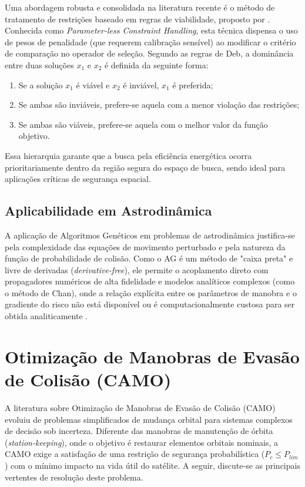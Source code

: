 Uma abordagem robusta e consolidada na literatura recente é o método de tratamento de restrições baseado em regras de viabilidade, proposto por . Conhecida como \textit{Parameter-less Constraint Handling}, esta técnica dispensa o uso de pesos de penalidade (que requerem calibração sensível) ao modificar o critério de comparação no operador de seleção. Segundo as regras de Deb, a dominância entre duas soluções $x_1$ e $x_2$ é definida da seguinte forma:

\begin{enumerate}
    \item Se a solução $x_1$ é viável e $x_2$ é inviável, $x_1$ é preferida;
    \item Se ambas são inviáveis, prefere-se aquela com a menor violação das restrições;
    \item Se ambas são viáveis, prefere-se aquela com o melhor valor da função objetivo.
\end{enumerate}

Essa hierarquia garante que a busca pela eficiência energética ocorra prioritariamente dentro da região segura do espaço de busca, sendo ideal para aplicações críticas de segurança espacial.

\subsection{Aplicabilidade em Astrodinâmica}

A aplicação de Algoritmos Genéticos em problemas de astrodinâmica justifica-se pela complexidade das equações de movimento perturbado e pela natureza da função de probabilidade de colisão. Como o AG é um método de "caixa preta" e livre de derivadas (\textit{derivative-free}), ele permite o acoplamento direto com propagadores numéricos de alta fidelidade e modelos analíticos complexos (como o método de Chan), onde a relação explícita entre os parâmetros de manobra e o gradiente do risco não está disponível ou é computacionalmente custosa para ser obtida analiticamente \cite{Vasile2011}.

\section{Otimização de Manobras de Evasão de Colisão (CAMO)}
\label{sec:camo_review}

A literatura sobre Otimização de Manobras de Evasão de Colisão (CAMO) evoluiu de problemas simplificados de mudança orbital para sistemas complexos de decisão sob incerteza. Diferente das manobras de manutenção de órbita (\textit{station-keeping}), onde o objetivo é restaurar elementos orbitais nominais, a CAMO exige a satisfação de uma restrição de segurança probabilística ($P_c \le P_{lim}$) com o mínimo impacto na vida útil do satélite. A seguir, discute-se as principais vertentes de resolução deste problema.

